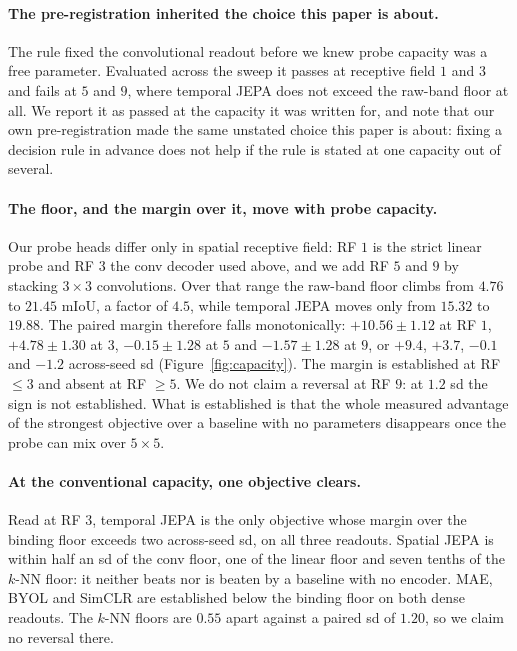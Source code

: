 \documentclass{article}
\begin{document}
\paragraph{The pre-registration inherited the choice this paper is about.} The rule fixed the
convolutional readout before we knew probe capacity was a free parameter. Evaluated across the sweep
it passes at receptive field $1$ and $3$ and fails at $5$ and $9$, where temporal JEPA does not
exceed the raw-band floor at all. We report it as passed at the capacity it was written for, and note
that our own pre-registration made the same unstated choice this paper is about: fixing a decision
rule in advance does not help if the rule is stated at one capacity out of several.

\paragraph{The floor, and the margin over it, move with probe capacity.} Our probe heads differ only
in spatial receptive field: RF $1$ is the strict linear probe and RF $3$ the conv decoder used above,
and we add RF $5$ and $9$ by stacking $3{\times}3$ convolutions. Over that range the raw-band floor
climbs from $4.76$ to $21.45$ mIoU, a factor of $4.5$, while temporal JEPA moves only from $15.32$ to
$19.88$. The paired margin therefore falls monotonically: $+10.56 \pm 1.12$ at RF $1$, $+4.78 \pm
1.30$ at $3$, $-0.15 \pm 1.28$ at $5$ and $-1.57 \pm 1.28$ at $9$, or $+9.4$, $+3.7$, $-0.1$ and
$-1.2$ across-seed sd (Figure~\ref{fig:capacity}). The margin is established at RF ${\leq}3$ and
absent at RF ${\geq}5$. We do not claim a reversal at RF $9$: at $1.2$ sd the sign is not
established. What is established is that the whole measured advantage of the strongest objective over
a baseline with no parameters disappears once the probe can mix over $5{\times}5$.

\paragraph{At the conventional capacity, one objective clears.} Read at RF $3$, temporal JEPA is the
only objective whose margin over the binding floor exceeds two across-seed sd, on all three readouts.
Spatial JEPA is within half an sd of the conv floor, one of the linear floor and seven tenths of the
$k$-NN floor: it neither beats nor is beaten by a baseline with no encoder. MAE, BYOL and SimCLR are
established below the binding floor on both dense readouts. The $k$-NN floors are $0.55$ apart
against a paired sd of $1.20$, so we claim no reversal there.
\end{document}
